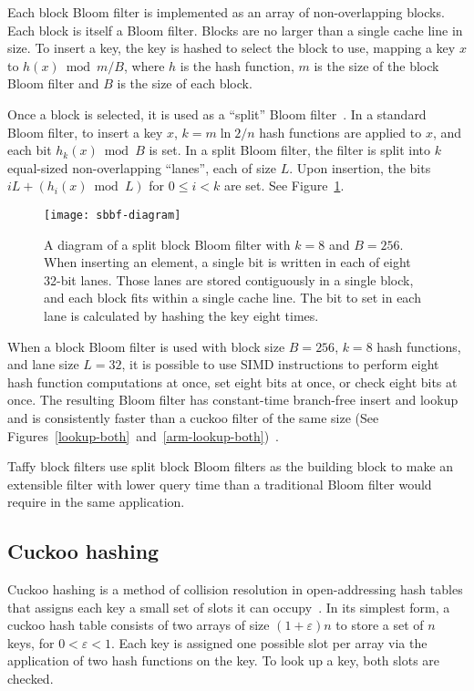 \documentclass[letterpaper,twocolumn,10pt]{article}
\begin{document}
Each block Bloom filter is implemented as an array of non-overlapping blocks.
Each block is itself a Bloom filter.
Blocks are no larger than a single cache line in size.
To insert a key, the key is hashed to select the block to use, mapping a key $x$ to $h(x) \bmod m/B$, where $h$ is the hash function, $m$ is the size of the block Bloom filter and $B$ is the size of each block.

Once a block is selected, it is used as a ``split'' Bloom filter~\cite{split-bloom}.
In a standard Bloom filter, to insert a key $x$, $k = m \ln 2 / n$ hash functions are applied to $x$, and each bit $h_k(x) \bmod B$ is set.
In a split Bloom filter, the filter is split into $k$ equal-sized non-overlapping ``lanes'', each of size $L$.
Upon insertion, the bits $i L + (h_i(x) \bmod L)$ for $0 \le i < k$ are set.
See Figure~\ref{sbbf-diagram}.

\begin{figure}
  \texttt{[image: sbbf-diagram]}
\caption{\label{sbbf-diagram}
A diagram of a split block Bloom filter with $k = 8$ and $B = 256$.
When inserting an element, a single bit is written in each of eight 32-bit lanes.
Those lanes are stored contiguously in a single block, and each block fits within a single cache line.
The bit to set in each lane is calculated by hashing the key eight times.
}
\end{figure}

When a block Bloom filter is used with block size $B = 256$, $k = 8$ hash functions, and lane size $L = 32$, it is possible to use SIMD instructions to perform eight hash function computations at once, set eight bits at once, or check eight bits at once.
The resulting Bloom filter has constant-time branch-free insert and lookup and is consistently faster than a cuckoo filter of the same size (See Figures~\ref{lookup-both}~and~\ref{arm-lookup-both})~\cite{cuckoo-filter-github,ultra-fast,overtakes,impala-bloom}.

Taffy block filters use split block Bloom filters as the building block to make an extensible filter with lower query time than a traditional Bloom filter would require in the same application.

\subsection{Cuckoo hashing}

Cuckoo hashing is a method of collision resolution in open-address\-ing hash tables that assigns each key a small set of slots it can occupy~\cite{cuckoo-journal}.
In its simplest form, a cuckoo hash table consists of two arrays of size $(1 + \varepsilon)n$ to store a set of $n$ keys, for $0 < \varepsilon < 1$.
Each key is assigned one possible slot per array via the application of two hash functions on the key.
To look up a key, both slots are checked.
\end{document}
